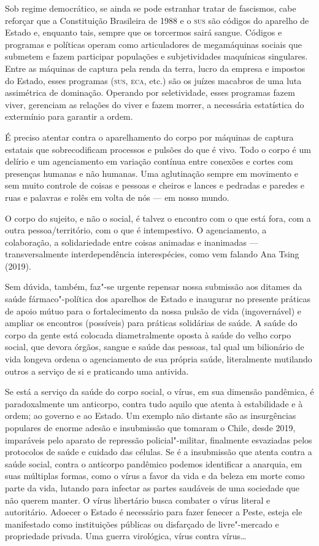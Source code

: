 Sob regime democrático, se ainda se pode estranhar tratar de fascismos,
cabe reforçar que a Constituição Brasileira de 1988 e o \textsc{sus} são códigos
do aparelho de Estado e, enquanto tais, sempre que os torcermos sairá
sangue. Códigos e programas e políticas operam como articuladores de
megamáquinas sociais que submetem e fazem participar populações e
subjetividades maquínicas singulares. Entre as máquinas de captura pela
renda da terra, lucro da empresa e impostos do Estado, esses programas
(\textsc{sus}, \textsc{eca}, etc.) são os juízes macabros de uma luta assimétrica de
dominação. Operando por seletividade, esses programas fazem viver,
gerenciam as relações do viver e fazem morrer, a necessária estatística
do extermínio para garantir a ordem.

É preciso atentar contra o aparelhamento do corpo por máquinas de
captura estatais que sobrecodificam processos e pulsões do que é vivo.
Todo o corpo é um delírio e um agenciamento em variação contínua entre
conexões e cortes com presenças humanas e não humanas. Uma aglutinação
sempre em movimento e sem muito controle de coisas e pessoas e cheiros e
lances e pedradas e paredes e ruas e palavras e rolês em volta de nós
--- em nosso mundo.

O corpo do sujeito, e não o social, é talvez o encontro com o que está
fora, com a outra pessoa/território, com o que é intempestivo. O
agenciamento, a colaboração, a solidariedade entre coisas animadas e
inanimadas --- transversalmente interdependência interespécies, como vem
falando Ana Tsing (2019).

Sem dúvida, também, faz"-se urgente repensar nossa submissão aos ditames
da saúde fármaco"-política dos aparelhos de Estado e inaugurar no
presente práticas de apoio mútuo para o fortalecimento da nossa pulsão
de vida (ingovernável) e ampliar os encontros (possíveis) para práticas
solidárias de saúde. A saúde do corpo da gente está colocada
diametralmente oposta à saúde do velho corpo social, que devora órgãos,
sangue e saúde das pessoas, tal qual um bilionário de vida longeva
ordena o agenciamento de sua própria saúde, literalmente mutilando
outros a serviço de si e praticando uma antivida.

Se está a serviço da saúde do corpo social, o vírus, em sua dimensão
pandêmica, é paradoxalmente um anticorpo, contra tudo aquilo que atenta
à estabilidade e à ordem; ao governo e ao Estado. Um exemplo não
distante são as insurgências populares de enorme adesão e insubmissão
que tomaram o Chile, desde 2019, imparáveis pelo aparato de repressão
policial"-militar, finalmente esvaziadas pelos protocolos de saúde e
cuidado das células. Se é a insubmissão que atenta contra a saúde
social, contra o anticorpo pandêmico podemos identificar a anarquia, em
suas múltiplas formas, como o vírus a favor da vida e da beleza em morte
como parte da vida, lutando para infectar as partes saudáveis de uma
sociedade que não querem manter. O
vírus libertário busca combater o vírus literal e autoritário. Adoecer o
Estado é necessário para fazer fenecer a Peste, esteja ele manifestado
como instituições públicas ou disfarçado de livre"-mercado e propriedade
privada. Uma guerra virológica, vírus contra vírus\ldots{}

